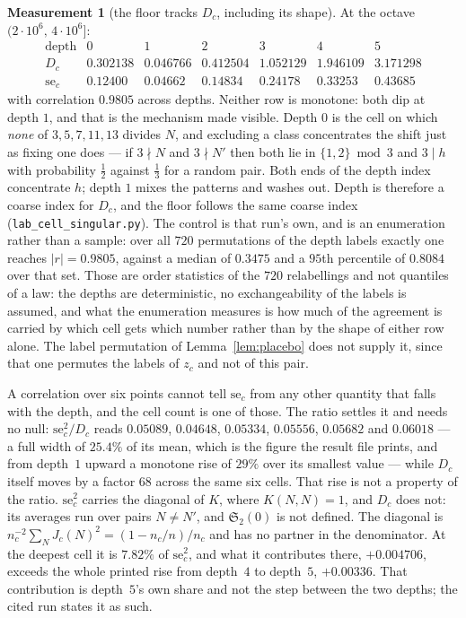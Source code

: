 \documentclass[11pt,a4paper]{article}
\theoremstyle{plain}
\theoremstyle{definition}
\newtheorem{measurement}[theorem]{Measurement}
\theoremstyle{remark}
\renewcommand{\SS}{\mathfrak{S}}
\begin{document}
\begin{measurement}[the floor tracks $D_c$, including its shape]%
\label{meas:Dc}
At the octave $(2\cdot10^6,\,4\cdot10^6]$:
\[
\begin{array}{r|cccccc}
 \text{depth} & 0 & 1 & 2 & 3 & 4 & 5\\\hline
 D_c & 0.302138 & 0.046766 & 0.412504 & 1.052129 & 1.946109
   & 3.171298\\
 \mathrm{se}_c & 0.12400 & 0.04662 & 0.14834 & 0.24178 & 0.33253
   & 0.43685
\end{array}
\]
with correlation $0.9805$ across depths. Neither row is monotone: both
dip at depth $1$, and that is the mechanism made visible. Depth $0$ is
the cell on which \emph{none} of $3,5,7,11,13$ divides $N$, and
excluding a class concentrates the shift just as fixing one does ---
if $3\nmid N$ and $3\nmid N'$ then both lie in $\{1,2\}\bmod3$ and
$3\mid h$ with probability $\tfrac12$ against $\tfrac13$ for a random
pair. Both ends of the depth index concentrate $h$; depth $1$ mixes
the patterns and washes out. Depth is therefore a coarse index for
$D_c$, and the floor follows the same coarse index
(\texttt{lab\_cell\_singular.py}). The control is that run's own, and
is an enumeration rather than a sample: over all $720$ permutations of
the depth labels exactly one reaches $|r|=0.9805$, against a median of
$0.3475$ and a $95$th percentile of $0.8084$ over that set. Those are
order statistics of the $720$ relabellings and not quantiles of a law:
the depths are deterministic, no exchangeability of the labels is
assumed, and what the enumeration measures is how much of the agreement
is carried by which cell gets which number rather than by the shape of
either row alone. The
label permutation of Lemma~\ref{lem:placebo} does not supply it, since
that one permutes the labels of $z_c$ and not of this pair.

A correlation over six points cannot tell $\mathrm{se}_c$ from any
other quantity that falls with the depth, and the cell count is one of
those. The ratio settles it and needs no null: $\mathrm{se}_c^2/D_c$
reads $0.05089$, $0.04648$, $0.05334$, $0.05556$, $0.05682$ and
$0.06018$ --- a full width of $25.4\%$ of its mean, which is the
figure the result file prints, and from depth~$1$ upward a monotone
rise of $29\%$ over its smallest value --- while $D_c$ itself moves by
a factor $68$ across the same six cells. That rise is not a property
of the ratio. $\mathrm{se}_c^2$ carries the diagonal of $K$, where
$K(N,N)=1$, and $D_c$ does not: its averages run over pairs $N\ne N'$,
and $\SS_2(0)$ is not defined. The diagonal is
$n_c^{-2}\sum_NJ_c(N)^2=(1-n_c/n)/n_c$ and has no partner in the
denominator. At the deepest cell it is $7.82\%$ of $\mathrm{se}_c^2$,
and what it contributes there, $+0.004706$, exceeds the whole printed
rise from depth~$4$ to depth~$5$, $+0.00336$. That contribution is
depth~$5$'s own share and not the step between the two depths; the
cited run states it as such.


\end{measurement}
\end{document}
